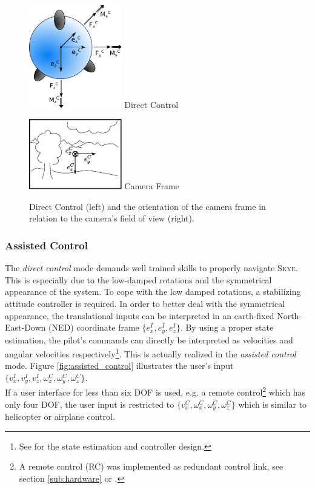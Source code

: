 \begin{figure}[H]		
	\small{
		\begin{center}
			\parbox{0.36\textwidth}{\centering \includegraphics[width=0.36\textwidth]{DC}
			 Direct Control}
			\hspace{0.1\textwidth}			
			\parbox{0.36\textwidth}{\centering \includegraphics[width=0.36\textwidth]{CameraFrame}
			Camera Frame}
	\caption[Direct Control]{Direct Control (left) and the orientation of the camera frame in relation to the camera's field of view (right).}
		\label{fig:direct_control}
		\end{center}
	}			
	\vspace{4.5mm}
\end{figure}


\subsubsection{Assisted Control} 
The \textit{direct control} mode demands well trained skills to properly navigate \textsc{Skye}. This is especially due to the low-damped rotations \cite{weichart} and the symmetrical appearance of the system. To cope with the low damped rotations, a stabilizing attitude controller is required. In order to better deal with the symmetrical appearance, the translational inputs can be interpreted in an earth-fixed North-East-Down (NED) coordinate frame $\{e_x^I, e_y^I, e_z^I\}$. By using a proper state estimation, the pilot's commands can directly be interpreted as velocities and angular velocities respectively\footnote{See \cite{meiermueri} for the state estimation and controller design.}. This is actually realized in the \textit{assisted control} mode. Figure \ref{fig:assisted_control} illustrates the user's input $\{v_x^I, v_y^I, v_z^I, \omega_x^C, \omega_y^C, \omega_z^C\}$. \\
If a user interface for less than six DOF is used, e.g. a remote control\footnote{A remote control (RC) was implemented as redundant control link, see section \ref{sub:hardware} or \cite{burri}.} which has only four DOF, the user input is restricted to $\{v_x^C, \omega_x^C, \omega_y^C, \omega_z^C\}$ which is similar to helicopter or airplane control.

